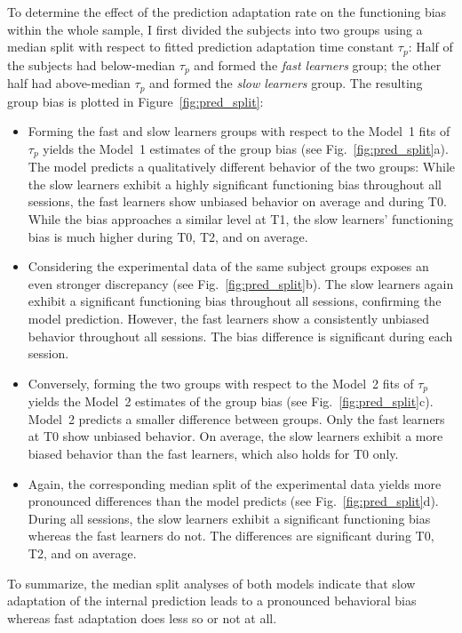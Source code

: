\documentclass[a4paper]{scrreprt}
\begin{document}
To determine the effect of the prediction adaptation rate on the functioning bias within the whole sample, I first divided the subjects into two groups using a median split with respect to fitted prediction adaptation time constant $\tau_p$: Half of the subjects had below-median $\tau_p$ and formed the \textit{fast learners} group; the other half had above-median $\tau_p$ and formed the \textit{slow learners} group.
The resulting group bias is plotted in Figure~\ref{fig:pred_split}:
\begin{itemize}
\item Forming the fast and slow learners groups with respect to the Model~1 fits of $\tau_p$ yields the Model~1 estimates of the group bias (see Fig.~\ref{fig:pred_split}a). The model predicts a qualitatively different behavior of the two groups: While the slow learners exhibit a highly significant functioning bias throughout all sessions, the fast learners show unbiased behavior on average and during T0. While the bias approaches a similar level at T1, the slow learners' functioning bias is much higher during T0, T2, and on average. 
\item Considering the experimental data of the same subject groups exposes an even stronger discrepancy (see Fig.~\ref{fig:pred_split}b). The slow learners again exhibit a significant functioning bias throughout all sessions, confirming the model prediction. However, the fast learners show a consistently unbiased behavior throughout all sessions. The bias difference is significant during each session.
\item Conversely, forming the two groups with respect to the Model~2 fits of $\tau_p$ yields the Model~2 estimates of the group bias (see Fig.~\ref{fig:pred_split}c). Model~2 predicts a smaller difference between groups. Only the fast learners at T0 show unbiased behavior. On average, the slow learners exhibit a more biased behavior than the fast learners, which also holds for T0 only.
\item Again, the corresponding median split of the experimental data yields more pronounced differences than the model predicts (see Fig.~\ref{fig:pred_split}d). During all sessions, the slow learners exhibit a significant functioning bias whereas the fast learners do not. The differences are significant during T0, T2, and on average.
\end{itemize}

To summarize, the median split analyses of both models indicate that slow adaptation of the internal prediction leads to a pronounced behavioral bias whereas fast adaptation does less so or not at all.
\end{document}
